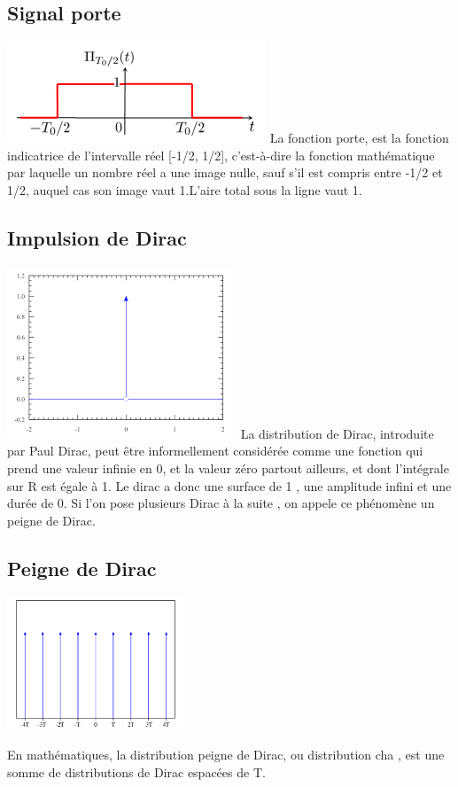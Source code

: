 \documentclass{article}
\begin{document}
\subsection{Signal porte}
\includegraphics{img/porte.png}
\newline \newline
La fonction porte, est la fonction indicatrice de l'intervalle r\'eel [-1/2, 1/2], c'est-\`a-dire la fonction math\'ematique par laquelle un nombre r\'eel a une image nulle, sauf s'il est compris entre -1/2 et 1/2, auquel cas son image vaut 1.L'aire total sous la ligne vaut 1.

\subsection{Impulsion de Dirac}
\includegraphics{img/dirac.png}
\newline \newline
La distribution de Dirac, introduite par Paul Dirac, peut \^etre informellement consid\'er\'ee comme une fonction qui prend une valeur infinie en 0, et la valeur z\'ero partout ailleurs, et dont l'int\'egrale sur R est \'egale \`a 1.
Le dirac a donc une surface de 1 , une amplitude infini et une dur\'ee de 0.
Si l'on pose plusieurs Dirac \`a la suite , on appele ce ph\'enom\`ene un peigne de Dirac.

\subsection{Peigne de Dirac}
\begin{center}
	\includegraphics{img/peigne.png}
\end{center}
En math\'ematiques, la distribution peigne de Dirac, ou distribution cha , est une somme de distributions de Dirac espac\'ees de T. 
\newline \newline
\end{document}
